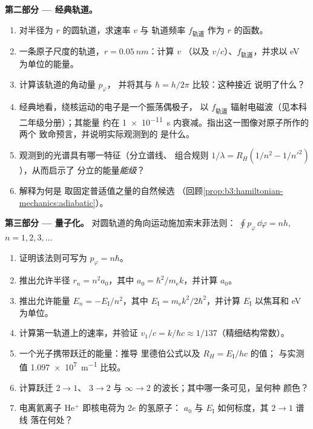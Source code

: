 \begin{problem}
\medskip\noindent\textbf{第二部分 --- 经典轨道。}
\begin{enumerate}[resume]
  \item 对半径为 $r$ 的圆轨道，求速率 $v$ 与
        轨道频率 $f_{\text{轨道}}$ 作为 $r$ 的函数。
  \item 一条原子尺度的轨道，$r = \qty{0.05}{nm}$：计算 $v$
        （以及 $v/c$）、$f_{\text{轨道}}$，并求以 eV 为单位的能量。
  \item 计算该轨道的角动量 $p_\varphi$，
        并将其与 $\hbar = h/2\pi$ 比较：这种接近
        说明了什么？
  \item 经典地看，绕核运动的电子是一个振荡偶极子，
        以 $f_{\text{轨道}}$ 辐射电磁波（见本科二年级分册）；其能量
        约在 \qty{1e-11}{s} 内衰减。指出这一图像对原子所作的两个
        致命预言，并说明实际观测到的
        是什么。
  \item 观测到的光谱具有哪一特征（分立谱线、
        组合规则 $1/\lambda = R_H(1/n^2 - 1/n'^2)$），从而启示了
        分立的能量\emph{能级}？
  \item 解释为何\emph{}是
        取固定普适值之量的自然候选
        （回顾\cref{prop:b3:hamiltonian-mechanics:adiabatic}）。
\end{enumerate}

\medskip\noindent\textbf{第三部分 --- 量子化。}
对圆轨道的角向运动施加索末菲法则：
$\oint p_\varphi\,\dd\varphi = nh$, $n = 1, 2, 3, \dots$
\begin{enumerate}[resume]
  \item 证明该法则可写为 $p_\varphi = n\hbar$。
  \item 推出允许半径 $r_n = n^2a_0$，其中 $a_0 =
        \hbar^2/m_{\text{e}}k$，并计算 $a_0$。
  \item 推出允许能量 $E_n = -E_{\text{I}}/n^2$，其中
        $E_{\text{I}} = m_{\text{e}}k^2/2\hbar^2$，并计算
        $E_{\text{I}}$ 以焦耳和 eV 为单位。
  \item 计算第一轨道上的速率，并验证 $v_1/c =
        k/\hbar c \approx 1/137$（精细结构常数）。
  \item 一个光子携带跃迁的能量：推导
        里德伯公式以及 $R_H = E_{\text{I}}/hc$ 的值；
        与实测值 \qty{1.097e7}{m^{-1}} 比较。
  \item 计算跃迁 $2 \to 1$、
        $3 \to 2$ 与 $\infty \to 2$ 的波长；其中哪一条可见，呈何种
        颜色？
  \item 电离氦离子 He$^+$ 即核电荷为 $2e$ 的氢原子：
        $a_0$ 与 $E_{\text{I}}$ 如何标度，其 $2 \to 1$ 谱线
        落在何处？
\end{enumerate}


\end{problem}
